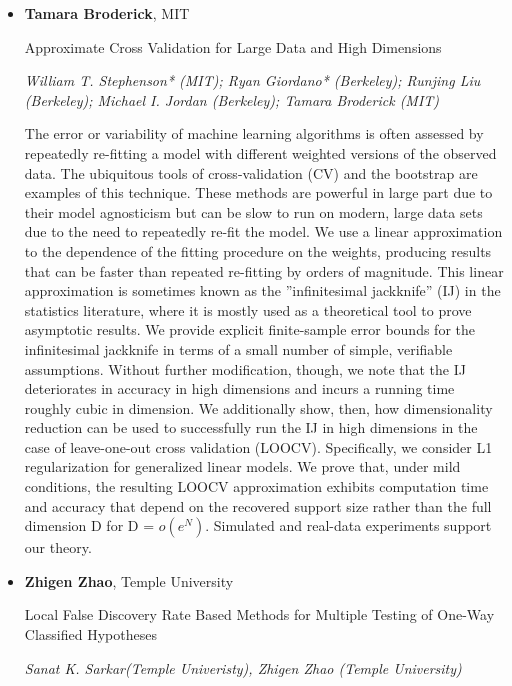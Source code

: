 \begin{itemize}
\item \textbf{Tamara Broderick}, MIT

Approximate Cross Validation for Large Data and High Dimensions

\emph{\footnotesize William T. Stephenson* (MIT); Ryan Giordano* (Berkeley); Runjing Liu (Berkeley); Michael I. Jordan (Berkeley); Tamara Broderick (MIT)}

The error or variability of machine learning algorithms is often assessed by repeatedly re-fitting a model with different weighted versions of the observed data. The ubiquitous tools of cross-validation (CV) and the bootstrap are examples of this technique. These methods are powerful in large part due to their model agnosticism but can be slow to run on modern, large data sets due to the need to repeatedly re-fit the model. We use a linear approximation to the dependence of the fitting procedure on the weights, producing results that can be faster than repeated re-fitting by orders of magnitude. This linear approximation is sometimes known as the ''infinitesimal jackknife'' (IJ) in the statistics literature, where it is mostly used as a theoretical tool to prove asymptotic results. We provide explicit finite-sample error bounds for the infinitesimal jackknife in terms of a small number of simple, verifiable assumptions. Without further modification, though, we note that the IJ deteriorates in accuracy in high dimensions and incurs a running time roughly cubic in dimension. We additionally show, then, how dimensionality reduction can be used to successfully run the IJ in high dimensions in the case of leave-one-out cross validation (LOOCV). Specifically, we consider L1 regularization for generalized linear models. We prove that, under mild conditions, the resulting LOOCV approximation exhibits computation time and accuracy that depend on the recovered support size rather than the full dimension D for D = $o(e^N).$ Simulated and real-data experiments support our theory.

\item \textbf{Zhigen Zhao}, Temple University

Local False Discovery Rate Based Methods for Multiple Testing of One-Way Classified Hypotheses

\emph{\footnotesize Sanat K. Sarkar(Temple Univeristy), Zhigen Zhao (Temple University)}


\end{itemize}
